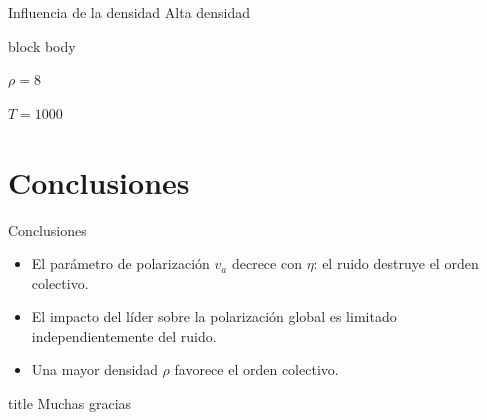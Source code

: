 \documentclass{beamer}
\begin{document}
\begin{frame}{Influencia de la densidad}
    \centering
    Alta densidad
    \vspace{5cm}

    \begin{beamercolorbox}[sep=2pt,center]{block body}
        \begin{minipage}[t]{0.2\textwidth}
            \centering
            \small{$\rho=8$}
        \end{minipage}
        \hfill
        \begin{minipage}[t]{0.3\textwidth}
            \centering
            \small{$T=1000$}
        \end{minipage}
    \end{beamercolorbox}
\end{frame}

\section{Conclusiones}
\begin{frame}{Conclusiones}
    \begin{itemize}
        \item El parámetro de polarización $v_a$ decrece con $\eta$: el ruido destruye el orden colectivo.
        \item El impacto del líder sobre la polarización global es limitado independientemente del ruido.
        \item Una mayor densidad $\rho$ favorece el orden colectivo.
    \end{itemize}
\end{frame}

\begin{frame}
    \begin{beamercolorbox}[sep=8pt,center]{title}
         Muchas gracias
    \end{beamercolorbox}
\end{frame}
\end{document}
